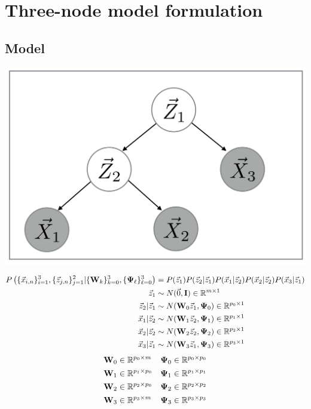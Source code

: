 \chapter{Three-node model formulation}
\section{Model}
\begin{center}
\includegraphics[width=\textwidth/3]{MFAA.png}
\end{center}
\newcommand{\fulljointp}{P \left(
  \{\x_{i,n}\}_{i=1}^3,\{ \z_{j,n}\}_{j=1}^2| \{\W_k\}_{k=0}^3,
    \{\bpsi_{\ell}\}_{\ell=0}^3 \right)}
\begin{align*}
  \fulljointp &= P(\z_1) P(\z_2 | \z_1) P(\x_1 | \z_2) P(\x_2 | \z_2)
                P(\x_3 | \z_1) \\
  \z_1 &\sim N(\vec{0}, \I ) \inreala{m}{1} \\
  \z_2| \z_1 &\sim N(\W_0 \z_1, \bpsi_0) \inreala{p_0}{1}\\
  \x_1 | \z_2 &\sim N(\W_1 \z_2, \bpsi_1) \inreala{ p_1}{1}\\
  \x_2 | \z_2 &\sim N(\W_2 \z_2, \bpsi_2) \inreala{p_2}{1} \\
  \x_3 | \z_1 &\sim N(\W_3 \z_1, \bpsi_3) \inreala{p_3}{1}
\end{align*}
\begin{align*}
  \bold{W}_0 &\in \mathbb{R}^{p_0 \times m} &   \bold{\Psi}_0 &\in \mathbb{R}^{p_0 \times p_0} \\
  \bold{W}_1 &\in \mathbb{R}^{p_1 \times p_0} &  \bold{\Psi}_1 &\in \mathbb{R}^{p_1 \times p_1}\\
  \bold{W}_2 &\in \mathbb{R}^{p_2 \times p_0} &   \bold{\Psi}_2 &\in \mathbb{R}^{p_2 \times p_2}\\
  \bold{W}_3 &\in \mathbb{R}^{p_3 \times m} &         \bold{\Psi}_3 &\in \mathbb{R}^{p_3 \times p_3}\\  
\end{align*}

